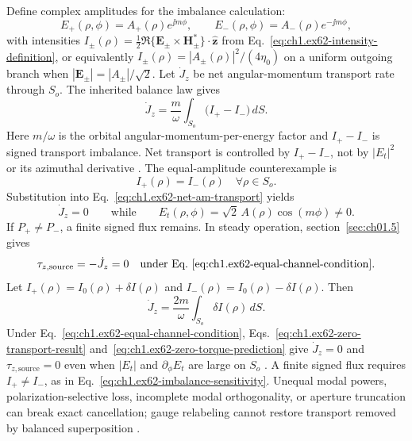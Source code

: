Define complex amplitudes for the imbalance calculation:
\begin{equation}
\label{eq:ch1.ex62-channel-amplitudes}
E_{+}(\rho,\phi)=A_+(\rho)e^{\jj m\phi},\qquad
E_{-}(\rho,\phi)=A_-(\rho)e^{-\jj m\phi},
\end{equation}
with intensities $I_\pm(\rho)=\tfrac12\Re\{\mathbf{E}_\pm\times\mathbf{H}_\pm^*\}\cdot\hat{\mathbf{z}}$
from Eq.~\eqref{eq:ch1.ex62-intensity-definition}, or equivalently
$I_\pm(\rho)=|A_\pm(\rho)|^2/(4\eta_0)$ on a uniform outgoing branch when $|\mathbf{E}_\pm|=|A_\pm|/\sqrt{2}$. Let
\(\dot J_z\) be net angular-momentum transport rate through \(S_o\). The inherited
balance law gives
\begin{equation}
\label{eq:ch1.ex62-net-am-transport}
\dot J_z
=
\frac{m}{\omega}
\int_{S_o}\!\big(I_+-I_-\big)\,dS.
\end{equation}
Here \(m/\omega\) is the orbital angular-momentum-per-energy factor and \(I_+-I_-\) is
signed transport imbalance. Net transport is controlled by \(I_+-I_-\), not by \(|E_t|^2\) or its azimuthal derivative \cite{stratton1941}. The equal-amplitude counterexample is
\begin{equation}
\label{eq:ch1.ex62-equal-channel-condition}
I_+(\rho)=I_-(\rho)\quad\forall \rho\in S_o.
\end{equation}
Substitution into Eq.~\eqref{eq:ch1.ex62-net-am-transport} yields
\begin{equation}
\label{eq:ch1.ex62-zero-transport-result}
\dot J_z=0
\qquad\text{while}\qquad
E_t(\rho,\phi)=\sqrt{2}\,A(\rho)\cos(m\phi)\neq 0.
\end{equation}
If \(P_+\neq P_-\), a finite signed flux remains. In steady operation, section~\ref{sec:ch01.5} gives
\begin{equation}
\label{eq:ch1.ex62-zero-torque-prediction}
\tau_{z,\mathrm{source}}
=
-\dot J_z
=
0
\quad\text{under Eq.~\eqref{eq:ch1.ex62-equal-channel-condition}}.
\end{equation}
Let
\(I_+(\rho)=I_0(\rho)+\delta I(\rho)\) and
\(I_-(\rho)=I_0(\rho)-\delta I(\rho)\). Then
\begin{equation}
\label{eq:ch1.ex62-imbalance-sensitivity}
\dot J_z
=
\frac{2m}{\omega}\int_{S_o}\delta I(\rho)\,dS.
\end{equation}
\label{prop:ch1.ex62-phase-insufficiency}
Under Eq.~\eqref{eq:ch1.ex62-equal-channel-condition}, Eqs.~\eqref{eq:ch1.ex62-zero-transport-result} and~\eqref{eq:ch1.ex62-zero-torque-prediction} give \(\dot J_z=0\) and \(\tau_{z,\mathrm{source}}=0\) even when \(|E_t|\) and \(\partial_\phi E_t\) are large on \(S_o\) \cite{stratton1941,beth1936}. A finite signed flux requires \(I_+\neq I_-\), as in Eq.~\eqref{eq:ch1.ex62-imbalance-sensitivity}. Unequal modal powers, polarization-selective loss, incomplete modal orthogonality, or aperture truncation can break exact cancellation; gauge relabeling cannot restore transport removed by balanced superposition \cite{poynting1884,harrington2001}.
